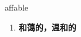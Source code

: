 
\begin{frame}
{\huge affable}
\begin{center}
\begin{enumerate}\Large
  \item \textbf{和蔼的，温和的}
\end{enumerate}
\end{center}
\end{frame}
